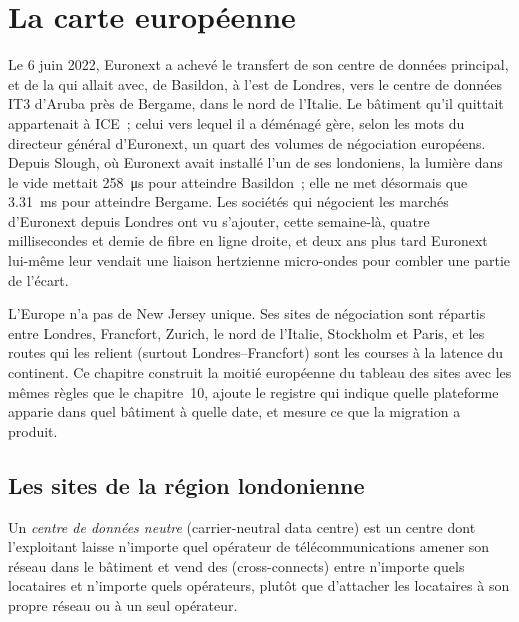 \chapter{La carte européenne}\label{ch:nw:the-european-map}

Le 6 juin 2022, Euronext a achevé le transfert de son centre de données principal, et de la  qui allait avec, de Basildon, à l'est de Londres, vers
le centre de données IT3 d'Aruba près de Bergame, dans le nord de l'Italie. Le bâtiment qu'il quittait appartenait à ICE~; celui vers lequel il a déménagé gère, selon les mots
du directeur général d'Euronext, un quart des volumes de négociation européens. Depuis Slough, où Euronext avait installé l'un de ses  londoniens, la lumière dans le vide mettait \qty{258}{\micro\second} pour atteindre Basildon~; elle ne met désormais que
\qty{3.31}{\milli\second} pour atteindre Bergame. Les sociétés qui négocient les marchés d'Euronext depuis Londres ont vu s'ajouter, cette semaine-là, quatre millisecondes et demie
de fibre en ligne droite, et deux ans plus tard Euronext lui-même leur vendait une liaison hertzienne micro-ondes pour combler une partie de l'écart.

L'Europe n'a pas de New Jersey unique. Ses sites de négociation sont répartis entre Londres, Francfort, Zurich, le nord de l'Italie, Stockholm et Paris, et les
routes qui les relient (surtout Londres--Francfort) sont les courses à la latence du continent. Ce chapitre construit la moitié européenne du
tableau des sites avec les mêmes règles que le chapitre~10, ajoute le registre qui indique quelle plateforme apparie dans quel bâtiment à quelle date, et mesure ce que
la migration a produit.

\section{Les sites de la région londonienne}

\begin{definition}\label{def:nw:the-european-map:neutral}
Un \emph{centre de données neutre} (carrier-neutral data centre) est un centre dont l'exploitant laisse n'importe quel opérateur de télécommunications amener son réseau
dans le bâtiment et vend des  (cross-connects) entre n'importe quels locataires et n'importe quels opérateurs, plutôt que d'attacher les locataires à son propre réseau ou à un seul opérateur.
\end{definition}

